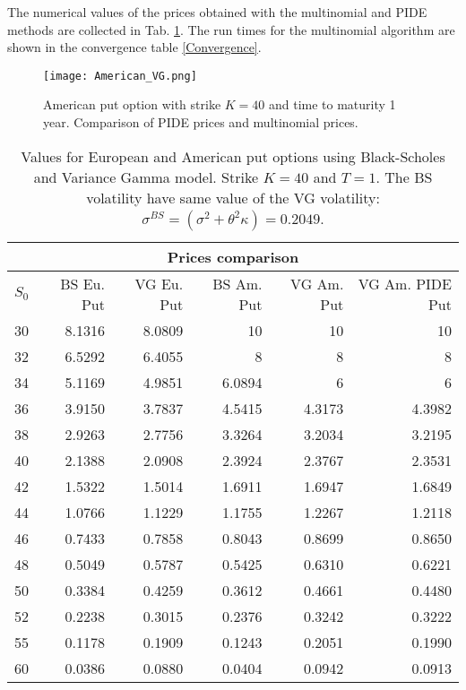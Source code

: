 The numerical values of the prices obtained with the multinomial and PIDE methods are collected in Tab. \ref{Option_values3}.
The run times for the multinomial algorithm are shown in the convergence table \ref{Convergence}.
\begin{figure}[ht!]
 \centering
 \texttt{[image: American\_VG.png]}
 \caption{American put option with strike $K=40$ and time to maturity 1 year. Comparison of PIDE prices and multinomial prices.}
 \label{AmVG}
\end{figure}
\begin{table}[!h]
{\begin{tabular}{||l|r|r|r|r|r||}
\hline
 \multicolumn{6}{|c|}{Prices comparison} \\
\hline
$S_0$ & BS Eu. Put & VG Eu. Put & BS Am. Put & VG Am. Put & VG Am. PIDE Put \\
 \hline
  30 & 8.1316 & 8.0809 & 10     & 10     & 10 \\
  32 & 6.5292 & 6.4055 & 8      & 8      & 8 \\
  34 & 5.1169 & 4.9851 & 6.0894 & 6      & 6 \\
  36 & 3.9150 & 3.7837 & 4.5415 & 4.3173 & 4.3982 \\
  38 & 2.9263 & 2.7756 & 3.3264 & 3.2034 & 3.2195 \\
  40 & 2.1388 & 2.0908 & 2.3924 & 2.3767 & 2.3531 \\
  42 & 1.5322 & 1.5014 & 1.6911 & 1.6947 & 1.6849 \\
  44 & 1.0766 & 1.1229 & 1.1755 & 1.2267 & 1.2118 \\
  46 & 0.7433 & 0.7858 & 0.8043 & 0.8699 & 0.8650 \\
  48 & 0.5049 & 0.5787 & 0.5425 & 0.6310 & 0.6221 \\
  50 & 0.3384 & 0.4259 & 0.3612 & 0.4661 & 0.4480 \\ 
  52 & 0.2238 & 0.3015 & 0.2376 & 0.3242 & 0.3222 \\
  55 & 0.1178 & 0.1909 & 0.1243 & 0.2051 & 0.1990 \\
  60 & 0.0386 & 0.0880 & 0.0404 & 0.0942 & 0.0913 \\ 
 \hline 
 \end{tabular}}
  \label{Option_values3}
  \caption{Values for European and American put options using Black-Scholes and Variance Gamma model. Strike $K=40$ and $T=1$. The BS volatility have same value of the VG volatility:  
  $ \sigma^{BS} = (\sigma^2 + \theta^2 \kappa) = 0.2049$. }
\end{table}

